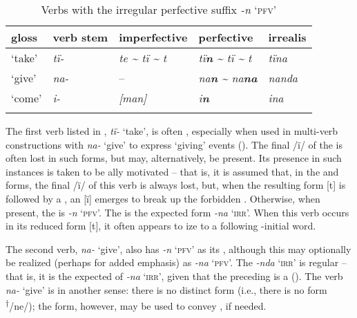 \begin{table}
 \caption{\label{tab:4.3}Verbs with the irregular perfective suffix \textit{-n} ‘\textsc{pfv}’}
\begin{tabularx}{\textwidth}{QQQQQ}
\lsptoprule
gloss & verb stem & imperfective & perfective & irrealis\\
\midrule
‘take’ & {\itshape tï-} & {\itshape te {\textasciitilde} tï {\textasciitilde} t}  & {\itshape tï\textbf{n} {\textasciitilde} tï {\textasciitilde} t} & {\itshape tïna}\\
‘give’ & {\itshape na-} & -- & {\itshape na\textbf{n} {\textasciitilde} na\textbf{na}} & {\itshape nanda}\\
‘come’ & {\itshape i-} & {\itshape [man]} & {\itshape i\textbf{n}} & {\itshape ina}\\
\lspbottomrule
\end{tabularx}
\end{table}
The first verb listed in , \textit{tï-} ‘take’, is often , especially when used in multi-verb constructions with \textit{na-} ‘give’ to express ‘giving’ events (). The final  /ï/ of the  is often lost in such  forms, but may, alternatively, be present. Its presence in such instances is taken to be ally motivated -- that is, it is assumed that, in the  and  forms, the final  /ï/ of this verb is always lost, but, when the resulting form [t] is followed by a , an  [ï] emerges to break up the forbidden . Otherwise, when present, the   is \textit{-n} ‘\textsc{pfv}’. The   is the expected form \textit{{}-na} ‘\textsc{irr}’. When this verb occurs in its reduced form [t], it often appears to ize to a following -initial word.

  The second verb, \textit{na-} ‘give’, also has \textit{-n} ‘\textsc{pfv}’ as its  , although this may optionally be realized (perhaps for added emphasis) as \textit{-na} ‘\textsc{pfv}’. The   \textit{-nda} ‘\textsc{irr}’ is regular -- that is, it is the expected  of \textit{-na} ‘\textsc{irr}’, given that the preceding  is a  (). The verb \textit{na-} ‘give’ is  in another sense: there is no distinct  form (i.e., there is no form \textsuperscript{†}/ne/); the  form, however, may be used to convey  , if needed.

